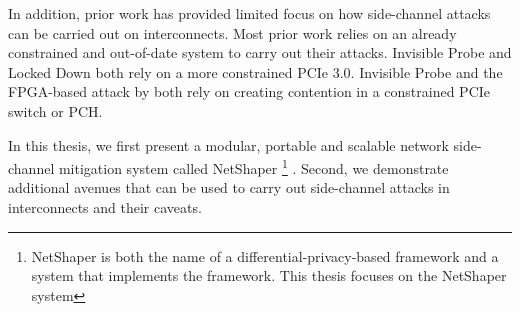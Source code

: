 In addition, prior work has provided limited focus on how side-channel attacks can be carried out on interconnects.
Most prior work relies on an already constrained and out-of-date system to carry out their attacks.
Invisible Probe \cite{tan2021invisible} and Locked Down \cite{side2022lockeddown} both rely on a more constrained PCIe 3.0.
Invisible Probe \cite{tan2021invisible} and the FPGA-based attack by \citet{giechaskiel2022cross} both rely on creating contention in a constrained PCIe switch or PCH.

In this thesis, we first present a modular, portable and scalable network side-channel mitigation system called NetShaper 
\footnote{NetShaper is both the name of a differential-privacy-based framework and a system that implements the framework. This thesis focuses on the NetShaper system} \cite{sabzi2024netshaper}.
Second, we demonstrate additional avenues that can be used to carry out side-channel attacks in interconnects and their caveats.

% 



\endinput

- The security and privacy of data in transit, whether it be on the internet or within a server (on the interconnect), is important. 
- While encryption has become the norm to ensure the security and privacy of data in transit, side-channel attacks can undermine this by using metadata like the shape of the traffic.
- Side-channel attacks can affect both data being sent over the internet and over interconnects
- While there is significant prior work in defending against side channels in internet networks, the solutions are not easily deployable and are not modular.
- In addition, prior work has provided limited focus on how side-channels can be carried out on interconnects.

-------------------------------------------------------------------------------------------------------------------
Computer networks have become a fundamental component of today's computing systems.
The Internet connects billions of devices worldwide and allows two users or devices to connect, regardless of how physically far apart they are.
Data centre networks link servers and storage systems, providing the infrastructure for large-scale computing.
Beyond these traditional networks, interconnects like PCIe and CXL enable the CPU to communicate with peripheral devices and accelerators such as the GPU.

